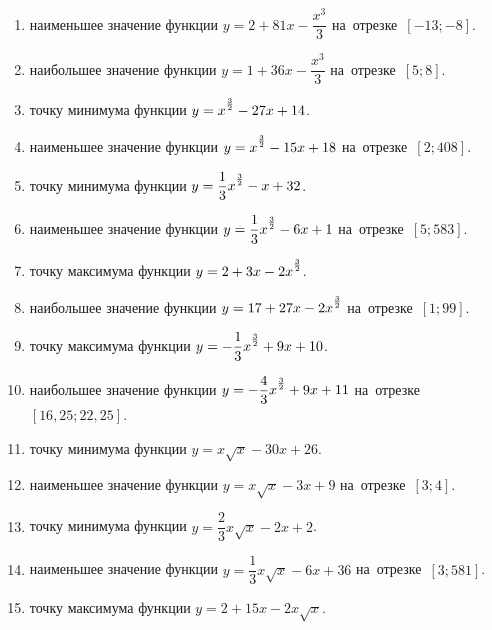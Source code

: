 \documentclass[a4paper,10pt]{article}
\begin{document}
\begin{enumerate}
\item {} наименьшее значение функции $y=2 +81x-\dfrac{x^3}{3}$ на~отрезке~$\left[-13;-8\right]$.

\item {} наибольшее значение функции $y=1 +36x-\dfrac{x^3}{3}$ на~отрезке~$\left[5;8\right]$.

\item {} точку минимума функции $y=x\strut^{\frac{3}{2}} -27x+14$.

\item {} наименьшее значение функции $y=x\strut^{\frac{3}{2}} -15x+18$ на~отрезке~$\left[2;408\right]$.

\item {} точку минимума функции $y=\dfrac{1}{3}x\strut^{\frac{3}{2}} -x+32$.

\item {} наименьшее значение функции $y=\dfrac{1}{3}x\strut^{\frac{3}{2}} -6x+1$ на~отрезке~$\left[5;583\right]$.

\item {} точку максимума функции $y=2+3x-2x\strut^{\frac{3}{2}}$.

\item {} наибольшее значение функции $y=17+27x-2x\strut^{\frac{3}{2}}$ на~отрезке~$\left[1;99\right]$.

\item {} точку максимума функции $y=-\dfrac{1}{3}x\strut^{\frac{3}{2}} +9x+10$.

\item {} наибольшее значение функции $y=-\dfrac{4}{3}x\strut^{\frac{3}{2}} +9x+11$ на~отрезке~$\left[16,25;22,25\right]$.

\item {} точку минимума функции $y=x\sqrt{x} -30x+26$.

\item {} наименьшее значение функции $y=x\sqrt{x} -3x+9$ на~отрезке~$\left[3;4\right]$.

\item {} точку минимума функции $y=\dfrac{2}{3}x\sqrt{x} -2x+2$.

\item {} наименьшее значение функции $y=\dfrac{1}{3}x\sqrt{x} -6x+36$ на~отрезке~$\left[3;581\right]$.

\item {} точку максимума функции $y=2+15x -2x\sqrt{x}$.


\end{enumerate}
\end{document}
